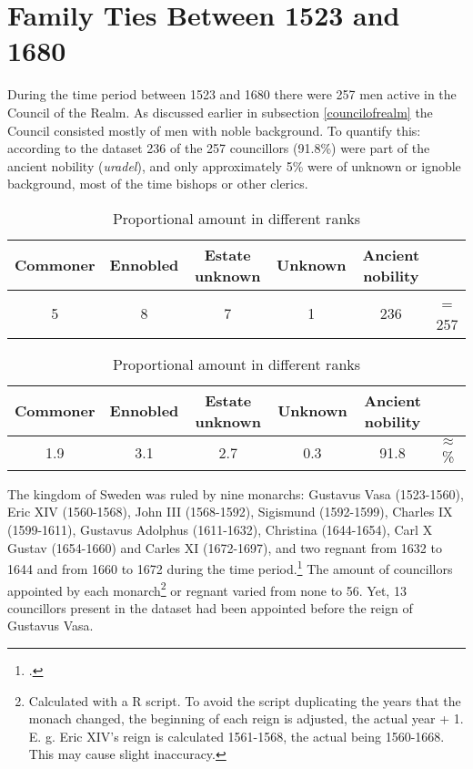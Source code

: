 \section{Family Ties Between 1523 and 1680}
During the time period between 1523 and 1680 there were 257 men active in the Council of the Realm. As discussed earlier in subsection \ref{councilofrealm} the Council consisted mostly of men with noble background. To quantify this: according to the dataset 236 of the 257 councillors (91.8\%) were part of the ancient nobility (\textit{uradel}), and only approximately 5\% were of unknown or ignoble background, most of the time bishops or other clerics.  

\begin{table}
	\caption[Absolute amount in different ranks]{Absolute amount in different ranks (Data by \cite{councillorsDS}, statistics by author)}
	\centering
	\begin{tabular}{cccccc}
		\hline
		Commoner & Ennobled & Estate unknown & Unknown & Ancient nobility & \\
		\hline
		5 & 8 & 7 & 1 & 236 & = 257 \\
		\hline
	\end{tabular}
	\caption{Proportional amount in different ranks}
	\centering
	\begin{tabular}{cccccc}
		\hline
	    Commoner & Ennobled & Estate unknown & Unknown & Ancient nobility & \\
	    \hline
	    1.9 & 3.1 & 2.7 & 0.3 & 91.8 & $\approx$ \% \\
	\end{tabular}
\end{table}

The kingdom of Sweden was ruled by nine monarchs: Gustavus Vasa (1523-1560), Eric XIV (1560-1568), John III (1568-1592), Sigismund (1592-1599), Charles IX (1599-1611), Gustavus Adolphus (1611-1632), Christina (1644-1654), Carl X Gustav (1654-1660) and Carles XI (1672-1697), and two regnant from 1632 to 1644 and from 1660 to 1672 during the time period.\footcite[p. 11]{lappalainen06} The amount of councillors appointed by each monarch\footnote{Calculated with a R script. To avoid the script duplicating the years that the monach changed, the beginning of each reign is adjusted, the actual year + 1. E. g. Eric XIV's reign is calculated 1561-1568, the actual being 1560-1668. This may cause slight inaccuracy.} or regnant varied from none to 56. Yet, 13 councillors present in the dataset had been appointed before the reign of Gustavus Vasa.

